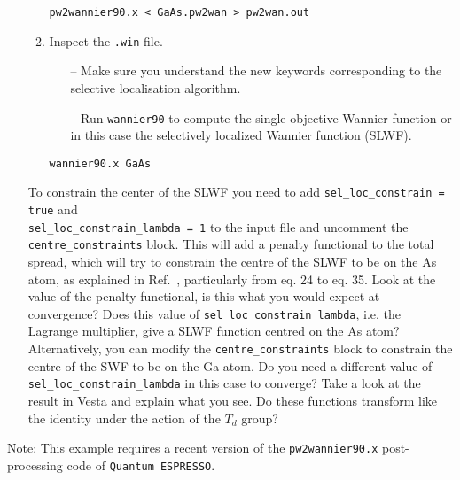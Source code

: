 \documentclass[a4paper,11pt,twoside]{article}
\begin{document}
\begin{itemize}
\begin{enumerate}
\begin{itemize}
\end{itemize}


\verb|pw2wannier90.x < GaAs.pw2wan > pw2wan.out|

\item Inspect the {\tt .win} file.

\begin{itemize}
\item[--] Make sure you understand the new keywords corresponding to the selective localisation algorithm. 
\item[--] Run {\tt wannier90} to compute the single objective Wannier function or in this case the selectively localized Wannier function (SLWF).

\end{itemize}


\verb|wannier90.x GaAs|

\end{enumerate}

To constrain the center of the SLWF you need to add \mbox{{\tt sel\_loc\_constrain = true}} and \\ 
\mbox{{\tt sel\_loc\_constrain\_lambda = 1}} to the input file and uncomment the \mbox{{\tt centre\_constraints}} block. This will add a penalty functional to the total spread, which will try to constrain the centre of the SLWF to be on the As atom, as explained in Ref.~\cite{Marianetti}, particularly from eq. 24 to eq. 35.  
Look at the value of the penalty functional, is this what you would expect at convergence? 
Does this value of {\tt sel\_loc\_constrain\_lambda}, i.e. the Lagrange multiplier, give a SLWF function centred on the As atom?   
Alternatively, you can modify the {\tt centre\_constraints} block to constrain the centre of the SWF to be on the Ga atom. 
Do you need a different value of {\tt sel\_loc\_constrain\_lambda} in this case to converge?
Take a look at the result in Vesta and explain what you see. Do these functions transform like the identity under the action of the $T_d$ group? 


\end{itemize}


Note: This example requires a recent version of the {\tt pw2wannier90.x} post-processing code of {\tt Quantum ESPRESSO}.
\end{document}
